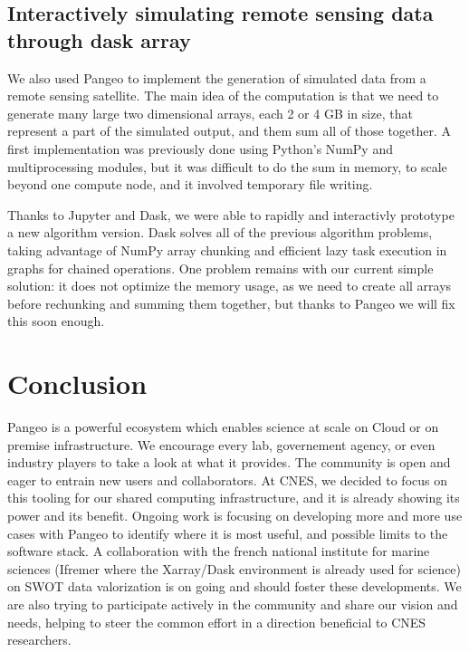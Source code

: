 \documentclass{article}
\begin{document}
\subsection{Interactively simulating remote sensing data through dask array}
\label{ssec:usecase2}

We also used Pangeo to implement the generation of simulated data from a remote sensing satellite. The main idea of the computation is that we need to generate many large two dimensional arrays, each 2 or 4 GB in size, that represent a part of the simulated output, and them sum all of those together. A first implementation was previously done using Python's NumPy and multiprocessing modules, but it was difficult to do the sum in memory, to scale beyond one compute node, and it involved temporary file writing.

Thanks to Jupyter and Dask, we were able to rapidly and interactivly prototype a new algorithm version. Dask solves all of the previous algorithm problems, taking advantage of NumPy array chunking and efficient lazy task execution in graphs for chained operations. One problem remains with our current simple solution: it does not optimize the memory usage, as we need to create all arrays before rechunking and summing them together, but thanks to Pangeo we will fix this soon enough.

\section{Conclusion}
\label{sec:conclusion}

Pangeo is a powerful ecosystem which enables science at scale on Cloud or on premise infrastructure. We encourage every lab, governement agency, or even industry players to take a look at what it provides. The community is open and eager to entrain new users and collaborators.
At CNES, we decided to focus on this tooling for our shared computing infrastructure, and it is already showing its power and its benefit. Ongoing work is focusing on developing more and more use cases with Pangeo to identify where it is most useful, and possible limits to the software stack. A collaboration with the french national institute for marine sciences (Ifremer where the Xarray/Dask environment is already used for science\cite{b9}) on SWOT data valorization is on going and should foster these developments. We are also trying to participate actively in the community and share our vision and needs, helping to steer the common effort in a direction beneficial to CNES researchers.
\end{document}
